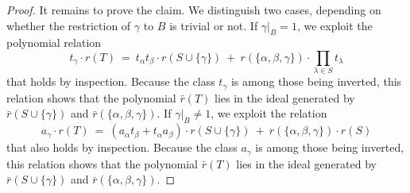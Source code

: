 \documentclass{amsart}[12pt]
\numberwithin{equation}{section}
\theoremstyle{definition}
\begin{document}
\begin{proof}
  It remains to prove the claim. We distinguish two cases,
  depending on whether the restriction of $\gamma$ to $B$ is trivial or not.
  If $\gamma|_B= 1$, we exploit the polynomial relation 
  \[ t_{\gamma}\cdot r(T)\ = \   t_\alpha t_\beta\cdot r(S\cup\{\gamma\})
   \ + \ r(\{\alpha,\beta,\gamma\})\cdot \prod_{\lambda\in S}t_\lambda \]
 that holds by inspection.
 Because the class $t_\gamma$ is among those being inverted,
 this relation shows that the polynomial $\bar r(T)$ lies in the ideal generated by
 $\bar r(S\cup\{\gamma\})$ and $\bar r(\{\alpha,\beta,\gamma\})$.
 If $\gamma|_B\ne 1$, we exploit the relation 
 \[ a_{\gamma}\cdot r(T)\ = \
   (a_\alpha t_\beta+t_\alpha a_\beta)\cdot r(S\cup\{\gamma\})\ + \
   r(\{\alpha,\beta,\gamma\})\cdot r(S)  \]
 that also holds by inspection.
 Because the class $a_\gamma$ is among those being inverted,
 this relation shows that the polynomial $\bar r(T)$ lies in the ideal generated by
 $\bar r(S\cup\{\gamma\})$ and  $\bar r(\{\alpha,\beta,\gamma\})$.
\end{proof}
\end{document}
